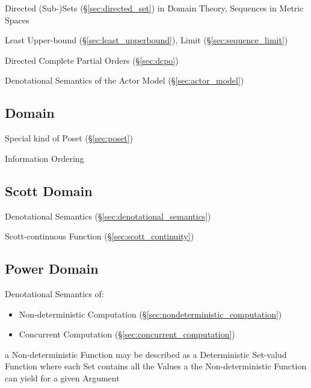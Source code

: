 Directed (Sub-)Sets (\S\ref{sec:directed_set}) in Domain Theory,
Sequences in Metric Spaces

Least Upper-bound (\S\ref{sec:least_upperbound}), Limit
(\S\ref{sec:sequence_limit})

Directed Complete Partial Orders (\S\ref{sec:dcpo})

Denotational Semantics of the Actor Model (\S\ref{sec:actor_model})



\subsection{Domain}\label{sec:order_domain}

Special kind of Poset (\S\ref{sec:poset})

Information Ordering



\subsection{Scott Domain}\label{sec:scott_domain}

Denotational Semantics (\S\ref{sec:denotational_semantics})

Scott-continuous Function (\S\ref{sec:scott_continuity})



\subsection{Power Domain}\label{sec:power_domain}

Denotational Semantics of:
\begin{itemize}
  \item Non-deterministic Computation
    (\S\ref{sec:nondeterministic_computation})
  \item Concurrent Computation (\S\ref{sec:concurrent_computation})
\end{itemize}

a Non-deterministic Function may be described as a Deterministic
Set-valud Function where each Set contains all the Values a the
Non-deterministic Function can yield for a given Argument

